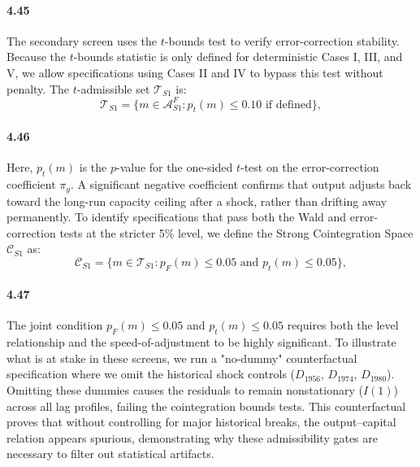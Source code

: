 \paragraph{4.45}
The secondary screen uses the $t$-bounds test to verify error-correction stability. Because the $t$-bounds statistic is only defined for deterministic Cases I, III, and V, we allow specifications using Cases II and IV to bypass this test without penalty. The $t$-admissible set $\mathcal{T}_{S1}$ is:
\begin{equation}
\mathcal{T}_{S1} = \{ m \in \mathcal{A}^{F}_{S1} : p_t(m) \leq 0.10 \text{ if defined} \},
\label{eq:T_S1}
\end{equation}

\paragraph{4.46}
Here, $p_t(m)$ is the $p$-value for the one-sided $t$-test on the error-correction coefficient $\pi_y$. A significant negative coefficient confirms that output adjusts back toward the long-run capacity ceiling after a shock, rather than drifting away permanently. To identify specifications that pass both the Wald and error-correction tests at the stricter 5\% level, we define the Strong Cointegration Space $\mathcal{C}_{S1}$ as:
\begin{equation}
\mathcal{C}_{S1} = \{ m \in \mathcal{T}_{S1} : p_F(m) \leq 0.05 \text{ and } p_t(m) \leq 0.05 \},
\label{eq:C_S1}
\end{equation}

\paragraph{4.47}
The joint condition $p_F(m) \leq 0.05$ and $p_t(m) \leq 0.05$ requires both the level relationship and the speed-of-adjustment to be highly significant. To illustrate what is at stake in these screens, we run a "no-dummy" counterfactual specification where we omit the historical shock controls ($D_{1956}$, $D_{1974}$, $D_{1980}$). Omitting these dummies causes the residuals to remain nonstationary ($I(1)$) across all lag profiles, failing the cointegration bounds tests. This counterfactual proves that without controlling for major historical breaks, the output--capital relation appears spurious, demonstrating why these admissibility gates are necessary to filter out statistical artifacts.

